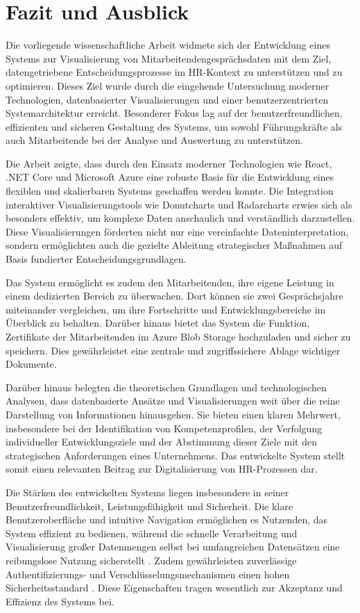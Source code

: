 \chapter{Fazit und Ausblick} 
\label{chap:fazit}

Die vorliegende wissenschaftliche Arbeit widmete sich der Entwicklung eines Systems zur Visualisierung von Mitarbeitendengesprächsdaten mit dem Ziel, datengetriebene Entscheidungsprozesse im HR-Kontext zu unterstützen und zu optimieren. Dieses Ziel wurde durch die eingehende Untersuchung moderner Technologien, datenbasierter Visualisierungen und einer benutzerzentrierten Systemarchitektur erreicht. Besonderer Fokus lag auf der benutzerfreundlichen, effizienten und sicheren Gestaltung des Systems, um sowohl Führungskräfte als auch Mitarbeitende bei der Analyse und Auswertung zu unterstützen.

Die Arbeit zeigte, dass durch den Einsatz moderner Technologien wie React, .NET Core und Microsoft Azure eine robuste Basis für die Entwicklung eines flexiblen und skalierbaren Systems geschaffen werden konnte. Die Integration interaktiver Visualisierungstools wie Donutcharts und Radarcharts erwies sich als besonders effektiv, um komplexe Daten anschaulich und verständlich darzustellen. Diese Visualisierungen förderten nicht nur eine vereinfachte Dateninterpretation, sondern ermöglichten auch die gezielte Ableitung strategischer Maßnahmen auf Basis fundierter Entscheidungsgrundlagen. 

Das System ermöglicht es zudem den Mitarbeitenden, ihre eigene Leistung in einem dedizierten Bereich zu überwachen. Dort können sie zwei Gesprächsjahre miteinander vergleichen, um ihre Fortschritte und Entwicklungsbereiche im Überblick zu behalten. Darüber hinaus bietet das System die Funktion, Zertifikate der Mitarbeitenden im Azure Blob Storage hochzuladen und sicher zu speichern. Dies gewährleistet eine zentrale und zugriffssichere Ablage wichtiger Dokumente.

Darüber hinaus belegten die theoretischen Grundlagen und technologischen Analysen, dass datenbasierte Ansätze und Visualisierungen weit über die reine Darstellung von Informationen hinausgehen. Sie bieten einen klaren Mehrwert, insbesondere bei der Identifikation von Kompetenzprofilen, der Verfolgung individueller Entwicklungsziele und der Abstimmung dieser Ziele mit den strategischen Anforderungen eines Unternehmens. Das entwickelte System stellt somit einen relevanten Beitrag zur Digitalisierung von HR-Prozessen dar.

Die Stärken des entwickelten Systems liegen insbesondere in seiner Benutzerfreundlichkeit, Leistungsfähigkeit und Sicherheit. Die klare Benutzeroberfläche und intuitive Navigation ermöglichen es Nutzenden, das System effizient zu bedienen, während die schnelle Verarbeitung und Visualisierung großer Datenmengen selbst bei umfangreichen Datensätzen eine reibungslose Nutzung sicherstellt \cite{heer2012interactive, chen2012interactive}. Zudem gewährleisten zuverlässige Authentifizierungs- und Verschlüsselungsmechanismen einen hohen Sicherheitsstandard \cite{boneder2023evaluation}. Diese Eigenschaften tragen wesentlich zur Akzeptanz und Effizienz des Systems bei.


